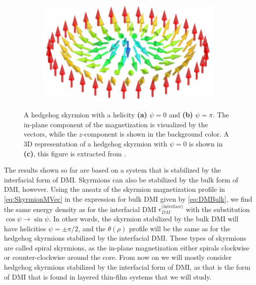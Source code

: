 \begin{figure}[h!]
\begin{subfigure}{.49\textwidth}
  \caption{}
  \label{fig:HedgehogSkyrmion2}
\end{subfigure}
\newline
\begin{subfigure}{.49\textwidth}
  \centering
  \includegraphics[width=\linewidth]{Figures/HedgehogSkyrmionEverschor.png}
  \caption{}
  \label{fig:HedgehogSkyrmion3}
\end{subfigure}
\caption{A hedgehog skyrmion with a helicity \textbf{(a)} $\psi = 0$ and \textbf{(b)} $\psi = \pi$. The in-plane component of the magnetization is visualized by the vectors, while the $z$-component is shown in the background color. A 3D representation of a hedgehog skyrmion with $\psi = 0$ is shown in \textbf{(c)}, this figure is extracted from \cite{EverschorDissertation}.}
\label{fig:HedgehogSkyrmions}
\end{figure}

The results shown so far are based on a system that is stabilized by the interfacial form of DMI. Skyrmions can also be stabilized by the bulk form of DMI, however. Using the ansatz of the skyrmion magnetization profile in \eqref{eq:SkyrmionMVec} in the expression for bulk DMI given by \eqref{eq:DMBulk}, we find the same energy density as for the interfacial DMI $\epsilon_{DM}^{\textrm{(interface)}}$ with the substitution $\cos\psi \rightarrow \sin\psi$. In other words, the skyrmion stabilized by the bulk DMI will have helicities $\psi=\pm\pi/2$, and the $\theta(\rho)$ profile will be the same as for the hedgehog skyrmions stabilized by the interfacial DMI. These types of skyrmions are called spiral skyrmions, as the in-plane magnetization either spirals clockwise or counter-clockwise around the core. From now on we will mostly consider hedgehog skyrmions stabilized by the interfacial form of DMI, as that is the form of DMI that is found in layered thin-film systems that we will study.

